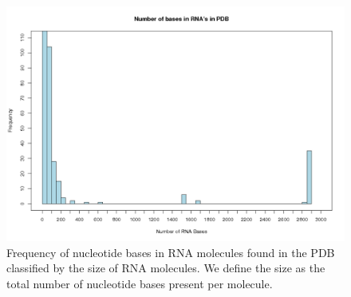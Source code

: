 \begin{figure}[H]
\centering
\includegraphics[scale=0.60]{histogram.png}
\caption{Frequency of nucleotide bases in RNA molecules found in the
  PDB classified by the size of RNA molecules. We define the size as the
  total number of nucleotide bases present per molecule.}
  \label{fig:rnaranges}
\end{figure}


